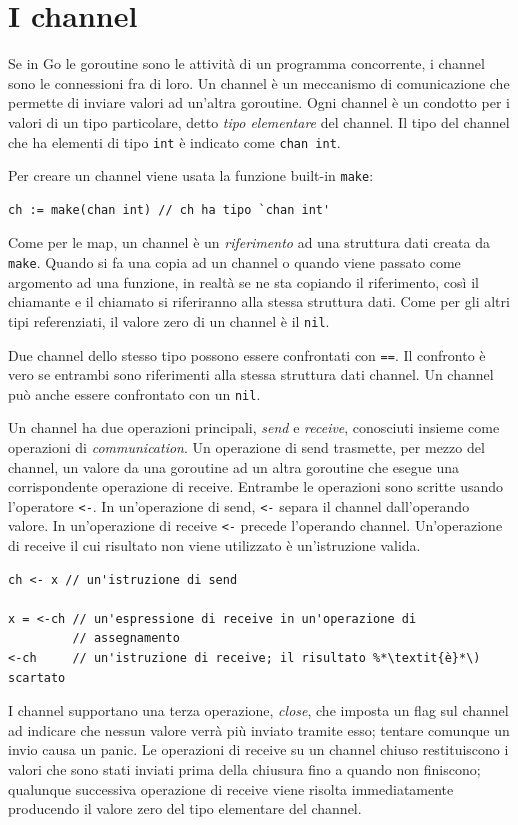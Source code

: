 \section{I channel}
\label{sec:channel}%
Se in Go le goroutine sono le attività di un programma concorrente, i channel sono le connessioni fra di loro.
Un channel è un meccanismo di comunicazione che permette di inviare valori ad un'altra goroutine.
Ogni channel è un condotto per i valori di un tipo particolare, detto \textit{tipo elementare} del channel.
Il tipo del channel che ha elementi di tipo \verb|int| è indicato come \verb|chan int|.

Per creare un channel viene usata la funzione built-in \verb|make|:
\begin{lstlisting}[frame=single, label={lst:lstlisting7-4.1}]
ch := make(chan int) // ch ha tipo `chan int'
\end{lstlisting}
Come per le map, un channel è un \textit{riferimento} ad una struttura dati creata da \verb|make|.
Quando si fa una copia ad un channel o quando viene passato come argomento ad una funzione, in realtà se ne sta copiando il riferimento, così il chiamante e il chiamato si riferiranno alla stessa struttura dati.
Come per gli altri tipi referenziati, il valore zero di un channel è il \verb|nil|.

Due channel dello stesso tipo possono essere confrontati con \verb|==|.
Il confronto è vero se entrambi sono riferimenti alla stessa struttura dati channel.
Un channel può anche essere confrontato con un \verb|nil|.

Un channel ha due operazioni principali, \textit{send} e \textit{receive}, conosciuti insieme come operazioni di \textit{communication}.
Un operazione di send trasmette, per mezzo del channel, un valore da una goroutine ad un altra goroutine che esegue una corrispondente operazione di receive.
Entrambe le operazioni sono scritte usando l'operatore \verb|<-|.
In un'operazione di send, \verb|<-| separa il channel dall'operando valore.
In un'operazione di receive \verb|<-| precede l'operando channel.
Un'operazione di receive il cui risultato non viene utilizzato è un'istruzione valida.
\begin{lstlisting}[frame=single, label={lst:lstlisting7-4.2}]
ch <- x // un'istruzione di send

x = <-ch // un'espressione di receive in un'operazione di
         // assegnamento
<-ch     // un'istruzione di receive; il risultato %*\textit{è}*\) scartato
\end{lstlisting}
I channel supportano una terza operazione, \textit{close}, che imposta un flag sul channel ad indicare che nessun valore verrà più inviato tramite esso;
tentare comunque un invio causa un panic.
Le operazioni di receive su un channel chiuso restituiscono i valori che sono stati inviati prima della chiusura fino a quando non finiscono;
qualunque successiva operazione di receive viene risolta immediatamente producendo il valore zero del tipo elementare del channel.

